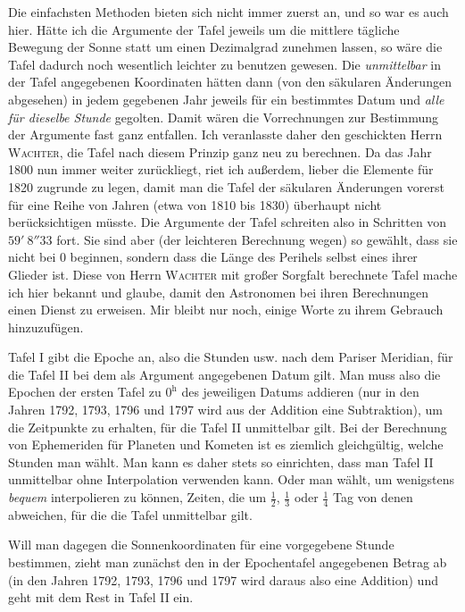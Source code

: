 Die einfachsten Methoden bieten sich nicht immer zuerst an, und so war es auch hier. Hätte ich die Argumente der Tafel jeweils um die mittlere tägliche Bewegung der Sonne statt um einen Dezimalgrad zunehmen lassen, so wäre die Tafel dadurch noch wesentlich leichter zu benutzen gewesen. Die \emph{unmittelbar} in der Tafel angegebenen Koordinaten hätten dann (von den säkularen Änderungen abgesehen) in jedem gegebenen Jahr jeweils für ein bestimmtes Datum und \emph{alle für dieselbe Stunde} gegolten. Damit wären die Vorrechnungen zur Bestimmung der Argumente fast ganz entfallen. Ich veranlasste daher den geschickten Herrn \textsc{Wachter}, die Tafel nach diesem Prinzip ganz neu zu berechnen. Da das Jahr 1800 nun immer weiter zurückliegt, riet ich außerdem, lieber die Elemente für 1820 zugrunde zu legen, damit man die Tafel der säkularen Änderungen vorerst für eine Reihe von Jahren (etwa von 1810 bis 1830) überhaupt nicht berücksichtigen müsste. Die Argumente der Tafel schreiten also in Schritten von $59'\ 8''33$ fort. Sie sind aber (der leichteren Berechnung wegen) so gewählt, dass sie nicht bei 0 beginnen, sondern dass die Länge des Perihels selbst eines ihrer Glieder ist. Diese von Herrn \textsc{Wachter} mit großer Sorgfalt berechnete Tafel mache ich hier bekannt und glaube, damit den Astronomen bei ihren Berechnungen einen Dienst zu erweisen. Mir bleibt nur noch, einige Worte zu ihrem Gebrauch hinzuzufügen.
%

Tafel I gibt die Epoche an, also die Stunden usw. nach dem Pariser Meridian, für die Tafel II bei dem als Argument angegebenen Datum gilt. Man muss also die Epochen der ersten Tafel zu $0^{\mathrm h}$ des jeweiligen Datums addieren (nur in den Jahren 1792, 1793, 1796 und 1797 wird aus der Addition eine Subtraktion), um die Zeitpunkte zu erhalten, für die Tafel II unmittelbar gilt. Bei der Berechnung von Ephemeriden für Planeten und Kometen ist es ziemlich gleichgültig, welche Stunden man wählt. Man kann es daher stets so einrichten, dass man Tafel II unmittelbar ohne Interpolation verwenden kann. Oder man wählt, um wenigstens \emph{bequem} interpolieren zu können, Zeiten, die um $\frac12$, $\frac13$ oder $\frac14$ Tag von denen abweichen, für die die Tafel unmittelbar gilt.

Will man dagegen die Sonnenkoordinaten für eine vorgegebene Stunde bestimmen, zieht man zunächst den in der Epochentafel angegebenen Betrag ab (in den Jahren 1792, 1793, 1796 und 1797 wird daraus also eine Addition) und geht mit dem Rest in Tafel II ein.

